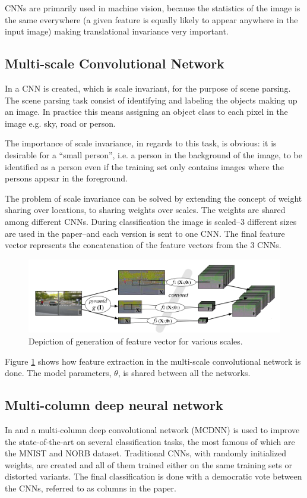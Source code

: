 \documentclass[11pt]{article}
\begin{document}
CNNs are primarily used in machine vision, because the statistics of the image is the same everywhere (a given feature is equally likely to appear anywhere in the input image) making translational invariance very important.

\subsection{Multi-scale Convolutional Network}

In \cite{farabet} a CNN is created, which is scale invariant, for the purpose of scene parsing.  The scene parsing task consist of identifying and labeling the objects making up an image.  In practice this means assigning an object class to each pixel in the image e.g. sky, road or person.

The importance of scale invariance, in regards to this task, is obvious: it is desirable for a ``small person'', i.e. a person in the background of the image, to be identified as a person even if the training set only contains images where the persons appear in the foreground.

The problem of scale invariance can be solved by extending the concept of weight sharing over locations, to sharing weights over scales.  The weights are shared among different CNNs.  During classification the image is scaled--3 different sizes are used in the paper--and each version is sent to one CNN.  The final feature vector represents the concatenation of the feature vectors from the 3 CNNs.

\begin{figure}[htb]
  \centering
  \includegraphics[width=\textwidth]{mymscnn.png}
  \caption{Depiction of generation of feature vector for various scales.}
  \label{fig:mscn}
\end{figure}

Figure \ref{fig:mscn} shows how feature extraction in the multi-scale convolutional network is done.  The model parameters, $\theta$, is shared between all the networks.

\subsection{Multi-column deep neural network}
In \cite{ciresan} and \cite{ciresan2} a multi-column deep convolutional network (MCDNN) is used to improve the state-of-the-art on several classification tasks, the most famous of which are the MNIST and NORB dataset.  Traditional CNNs, with randomly initialized weights, are created and all of them trained either on the same training sets or distorted variants.  The final classification is done with a democratic vote between the CNNs, referred to as columns in the paper.
\end{document}
